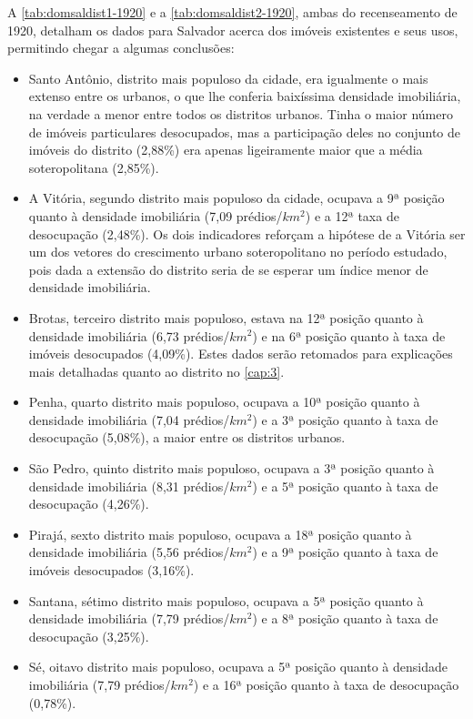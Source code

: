 % 

A \autoref{tab:domsaldist1-1920} e a \autoref{tab:domsaldist2-1920}, ambas do recenseamento de 1920, detalham os dados para Salvador acerca dos imóveis existentes e seus usos, permitindo chegar a algumas conclusões: 

\begin{itemize}
 \item Santo Antônio, distrito mais populoso da cidade, era igualmente o mais extenso entre os urbanos, o que lhe conferia baixíssima densidade imobiliária, na verdade a menor entre todos os distritos urbanos. Tinha o maior número de imóveis particulares desocupados, mas a participação deles no conjunto de imóveis do distrito (2,88\%) era apenas ligeiramente maior que a média soteropolitana (2,85\%).
 \item A Vitória, segundo distrito mais populoso da cidade, ocupava a 9ª posição quanto à densidade imobiliária (7,09 prédios/$km^{2}$) e a 12ª taxa de desocupação (2,48\%). Os dois indicadores reforçam a hipótese de a Vitória ser um dos vetores do crescimento urbano soteropolitano no período estudado, pois dada a extensão do distrito seria de se esperar um índice menor de densidade imobiliária.
 \item Brotas, terceiro distrito mais populoso, estava na 12ª posição quanto à densidade imobiliária (6,73 prédios/$km^{2}$) e na 6ª posição quanto à taxa de imóveis desocupados (4,09\%). Estes dados serão retomados para explicações mais detalhadas quanto ao distrito no \autoref{cap:3}.
 \item Penha, quarto distrito mais populoso, ocupava a 10ª posição quanto à densidade imobiliária (7,04 prédios/$km^{2}$) e a 3ª posição quanto à taxa de desocupação (5,08\%), a maior entre os distritos urbanos. 
 \item São Pedro, quinto distrito mais populoso, ocupava a 3ª posição quanto à densidade imobiliária (8,31 prédios/$km^{2}$) e a 5ª posição quanto à taxa de desocupação (4,26\%).
 \item Pirajá, sexto distrito mais populoso, ocupava a 18ª posição quanto à densidade imobiliária (5,56 prédios/$km^{2}$) e a 9ª posição quanto à taxa de imóveis desocupados (3,16\%). 
 \item Santana, sétimo distrito mais populoso, ocupava a 5ª posição quanto à densidade imobiliária (7,79 prédios/$km^{2}$) e a 8ª posição quanto à taxa de desocupação (3,25\%).
 \item Sé, oitavo distrito mais populoso, ocupava a 5ª posição quanto à densidade imobiliária (7,79 prédios/$km^{2}$) e a 16ª posição quanto à taxa de desocupação (0,78\%). 

\end{itemize}
